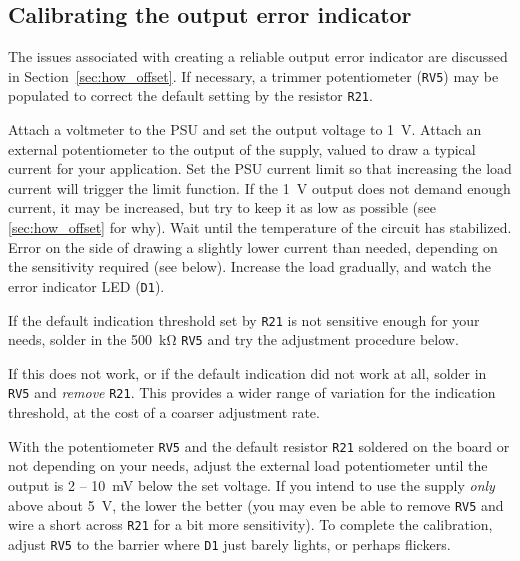 \documentclass[letterpaper,twocolumn,11pt]{article}
\newcommand{\refdes}[1]{\texttt{#1}}
\begin{document}
\subsection{Calibrating the output error indicator}\label{sec:cal_offset}

The issues associated with creating a reliable output error indicator are
discussed in Section~\ref{sec:how_offset}. If necessary, a trimmer potentiometer
(\refdes{RV5}) may be populated to correct the default setting by the resistor
\refdes{R21}.

Attach a voltmeter to the PSU and set the output voltage to \SI{1}{\V}. Attach
an external potentiometer to the output of the supply, valued to draw a typical
current for your application. Set the PSU current limit so that increasing the
load current will trigger the limit function. If the \SI{1}{\V} output does not
demand enough current, it may be increased, but try to keep it as low as
possible (see \ref{sec:how_offset} for why). Wait until the temperature of the
circuit has stabilized. Error on the side of drawing a slightly lower current
than needed, depending on the sensitivity required (see below). Increase the
load gradually, and watch the error indicator LED (\refdes{D1}).

If the default indication threshold set by \refdes{R21} is not sensitive enough
for your needs, solder in the \SI{500}{\kohm} \refdes{RV5} and try the
adjustment procedure below.

If this does not work, or if the default indication did not work at all, solder
in \refdes{RV5} and \emph{remove} \refdes{R21}. This provides a wider range of
variation for the indication threshold, at the cost of a coarser adjustment
rate.

With the potentiometer \refdes{RV5} and the default resistor \refdes{R21}
soldered on the board or not depending on your needs, adjust the external load
potentiometer until the output is 2 -- \SI{10}{\mV} below the set voltage. If
you intend to use the supply \emph{only} above about \SI{5}{\V}, the lower the
better (you may even be able to remove \refdes{RV5} and wire a short across
\refdes{R21} for a bit more sensitivity). To complete the calibration, adjust
\refdes{RV5} to the barrier where \refdes{D1} just barely lights, or perhaps
flickers.

\end{document}
